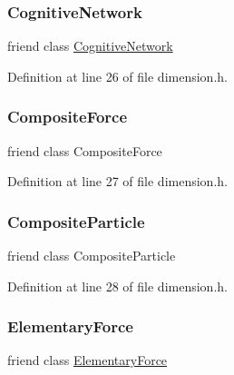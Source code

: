 \subsubsection{\texorpdfstring{Cognitive\+Network}{CognitiveNetwork}}
{\footnotesize\ttfamily friend class \hyperlink{class_cognitive_network}{Cognitive\+Network}\hspace{0.3cm}{\ttfamily [friend]}}



Definition at line 26 of file dimension.\+h.

\mbox{\label{class_dimension_a1dacbeca8e464bdc533a40a1b18f33b2}} 
\subsubsection{\texorpdfstring{Composite\+Force}{CompositeForce}}
{\footnotesize\ttfamily friend class Composite\+Force\hspace{0.3cm}{\ttfamily [friend]}}



Definition at line 27 of file dimension.\+h.

\mbox{\label{class_dimension_a8be5cf46db5f9876c49d58e4ab84044b}} 
\subsubsection{\texorpdfstring{Composite\+Particle}{CompositeParticle}}
{\footnotesize\ttfamily friend class Composite\+Particle\hspace{0.3cm}{\ttfamily [friend]}}



Definition at line 28 of file dimension.\+h.

\mbox{\label{class_dimension_a6e57500586e9cd366f5cf76ea0299957}} 
\subsubsection{\texorpdfstring{Elementary\+Force}{ElementaryForce}}
{\footnotesize\ttfamily friend class \hyperlink{class_elementary_force}{Elementary\+Force}\hspace{0.3cm}{\ttfamily [friend]}}



